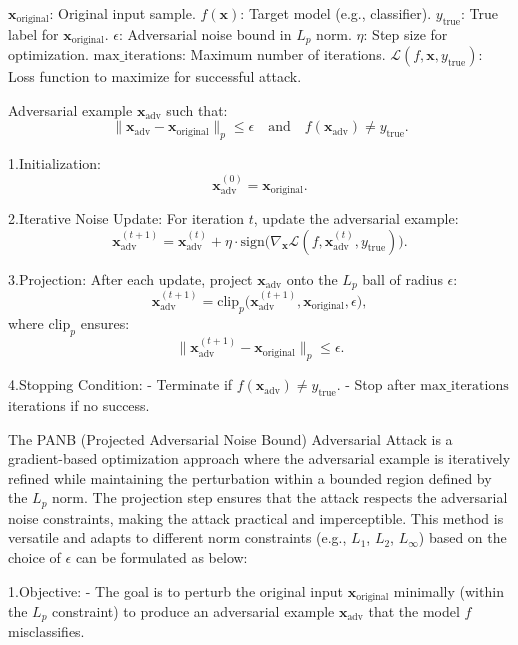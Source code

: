 $\mathbf{x}_{\text{original}}$: Original input sample.
$f(\mathbf{x})$: Target model (e.g., classifier).
$y_{\text{true}}$: True label for $\mathbf{x}_{\text{original}}$.
$\epsilon$: Adversarial noise bound in $L_p$ norm.
$\eta$: Step size for optimization.
$\text{max\_iterations}$: Maximum number of iterations.
$\mathcal{L}(f, \mathbf{x}, y_{\text{true}})$: Loss function to maximize for successful attack.

Adversarial example $\mathbf{x}_{\text{adv}}$ such that:
  \[
  \|\mathbf{x}_{\text{adv}} - \mathbf{x}_{\text{original}}\|_p \leq \epsilon \quad \text{and} \quad f(\mathbf{x}_{\text{adv}}) \neq y_{\text{true}}.
  \]

1.Initialization:
   \[
   \mathbf{x}_{\text{adv}}^{(0)} = \mathbf{x}_{\text{original}}.
   \]

2.Iterative Noise Update:
   For iteration $t$, update the adversarial example:
   \[
   \mathbf{x}_{\text{adv}}^{(t+1)} = \mathbf{x}_{\text{adv}}^{(t)} + \eta \cdot \text{sign}\big(\nabla_{\mathbf{x}} \mathcal{L}(f, \mathbf{x}_{\text{adv}}^{(t)}, y_{\text{true}})\big).
   \]

3.Projection:
   After each update, project $\mathbf{x}_{\text{adv}}$ onto the $L_p$ ball of radius $\epsilon$:
   \[
   \mathbf{x}_{\text{adv}}^{(t+1)} = \text{clip}_p\big(\mathbf{x}_{\text{adv}}^{(t+1)}, \mathbf{x}_{\text{original}}, \epsilon\big),
   \]
   where $\text{clip}_p$ ensures:
   \[
   \|\mathbf{x}_{\text{adv}}^{(t+1)} - \mathbf{x}_{\text{original}}\|_p \leq \epsilon.
   \]

4.Stopping Condition:
   - Terminate if $f(\mathbf{x}_{\text{adv}}) \neq y_{\text{true}}$.
   - Stop after $\text{max\_iterations}$ iterations if no success.

The PANB (Projected Adversarial Noise Bound) Adversarial Attack is a gradient-based optimization approach where the adversarial example is iteratively refined while maintaining the perturbation within a bounded region defined by the $L_p$ norm. The projection step ensures that the attack respects the adversarial noise constraints, making the attack practical and imperceptible. This method is versatile and adapts to different norm constraints (e.g., $L_1$, $L_2$, $L_\infty$) based on the choice of $\epsilon$ can be formulated as below:

1.Objective:
   - The goal is to perturb the original input $\mathbf{x}_{\text{original}}$ minimally (within the $L_p$ constraint) to produce an adversarial example $\mathbf{x}_{\text{adv}}$ that the model $f$ misclassifies.

